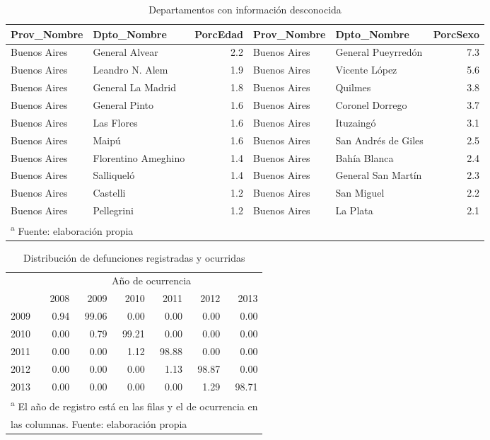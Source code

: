 \documentclass[12pt,]{article}
\begin{document}
\begin{table}

\caption{\label{tab:UnkSexAge}Departamentos con información desconocida}
\centering
\begin{tabular}[t]{l|l|r|l|l|r}
\hline
Prov\_Nombre & Dpto\_Nombre & PorcEdad & Prov\_Nombre & Dpto\_Nombre & PorcSexo\\
\hline
Buenos Aires & General Alvear & 2.2 & Buenos Aires & General Pueyrredón & 7.3\\
\hline
Buenos Aires & Leandro N. Alem & 1.9 & Buenos Aires & Vicente López & 5.6\\
\hline
Buenos Aires & General La Madrid & 1.8 & Buenos Aires & Quilmes & 3.8\\
\hline
Buenos Aires & General Pinto & 1.6 & Buenos Aires & Coronel Dorrego & 3.7\\
\hline
Buenos Aires & Las Flores & 1.6 & Buenos Aires & Ituzaingó & 3.1\\
\hline
Buenos Aires & Maipú & 1.6 & Buenos Aires & San Andrés de Giles & 2.5\\
\hline
Buenos Aires & Florentino Ameghino & 1.4 & Buenos Aires & Bahía Blanca & 2.4\\
\hline
Buenos Aires & Salliqueló & 1.4 & Buenos Aires & General San Martín & 2.3\\
\hline
Buenos Aires & Castelli & 1.2 & Buenos Aires & San Miguel & 2.2\\
\hline
Buenos Aires & Pellegrini & 1.2 & Buenos Aires & La Plata & 2.1\\
\hline
\multicolumn{6}{l}{\textsuperscript{a} Fuente: elaboración propia}\\
\end{tabular}
\end{table}

\begin{table}

\caption{\label{tab:def_tardias}Distribución de defunciones registradas y ocurridas}
\centering
\begin{tabular}[t]{l|r|r|r|r|r|r}
\hline
\multicolumn{1}{c|}{ } & \multicolumn{6}{c}{Año de ocurrencia} \\
\cline{2-7}
  & 2008 & 2009 & 2010 & 2011 & 2012 & 2013\\
\hline
2009 & 0.94 & 99.06 & 0.00 & 0.00 & 0.00 & 0.00\\
\hline
2010 & 0.00 & 0.79 & 99.21 & 0.00 & 0.00 & 0.00\\
\hline
2011 & 0.00 & 0.00 & 1.12 & 98.88 & 0.00 & 0.00\\
\hline
2012 & 0.00 & 0.00 & 0.00 & 1.13 & 98.87 & 0.00\\
\hline
2013 & 0.00 & 0.00 & 0.00 & 0.00 & 1.29 & 98.71\\
\hline
\multicolumn{7}{l}{\textsuperscript{a} El año de registro está en las filas y el de ocurrencia en}\\
\multicolumn{7}{l}{las columnas. Fuente: elaboración propia}\\
\end{tabular}
\end{table}
\end{document}
